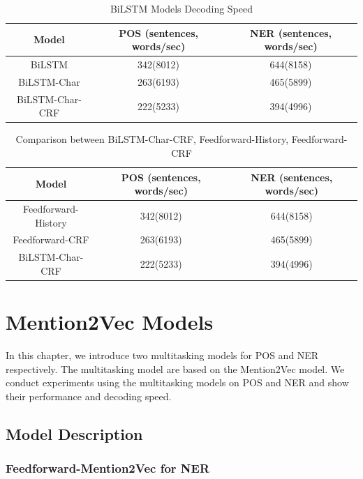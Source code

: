 \documentclass{sfuthesis}
\begin{document}
\begin{table}[]
\centering
\caption{BiLSTM Models Decoding Speed}
\label{table:lstm-table2}
\begin{tabular}{|c|c|c|}
\hline
Model       & POS  (sentences, words/sec)  & NER  (sentences, words/sec)      \\ \hline
BiLSTM             & 342(8012)     & 644(8158)       \\ \hline
BiLSTM-Char        & 263(6193)  & 465(5899)             \\ \hline
BiLSTM-Char-CRF    & 222(5233)  & 394(4996)         \\ \hline
\end{tabular}
\end{table}

\begin{table}[]
\centering
\caption{Comparison between BiLSTM-Char-CRF, Feedforward-History, Feedforward-CRF}
\label{table:lstm-table2}
\begin{tabular}{|c|c|c|}
\hline
Model       & POS  (sentences, words/sec)  & NER  (sentences, words/sec)      \\ \hline
Feedforward-History            & 342(8012)     & 644(8158)       \\ \hline
Feedforward-CRF        & 263(6193)  & 465(5899)             \\ \hline
BiLSTM-Char-CRF    & 222(5233)  & 394(4996)         \\ \hline
\end{tabular}
\end{table}

\chapter{Mention2Vec Models}

In this chapter, we introduce two multitasking models for POS and NER respectively. The multitasking model are based on the Mention2Vec model. We conduct experiments using the multitasking models on POS and NER and show their performance and decoding speed. 

\section{Model Description}

\subsection{Feedforward-Mention2Vec for NER}
\end{document}
